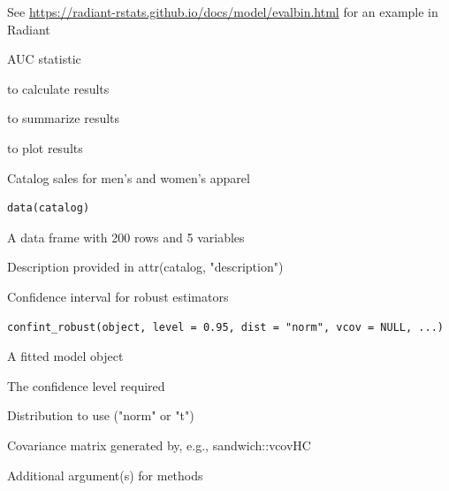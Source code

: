 \documentclass[a4paper]{book}
\begin{document}
%
\begin{Details}
See \url{https://radiant-rstats.github.io/docs/model/evalbin.html} for an example in Radiant
\end{Details}
%
\begin{Value}
AUC statistic
\end{Value}
%
\begin{SeeAlso}
 to calculate results

 to summarize results

 to plot results
\end{SeeAlso}
%
\begin{Examples}
\end{Examples}
%
\begin{Description}
Catalog sales for men's and women's apparel
\end{Description}
%
\begin{Usage}
\begin{verbatim}
data(catalog)
\end{verbatim}
\end{Usage}
%
\begin{Format}
A data frame with 200 rows and 5 variables
\end{Format}
%
\begin{Details}
Description provided in attr(catalog, "description")
\end{Details}
%
\begin{Description}
Confidence interval for robust estimators
\end{Description}
%
\begin{Usage}
\begin{verbatim}
confint_robust(object, level = 0.95, dist = "norm", vcov = NULL, ...)
\end{verbatim}
\end{Usage}
%
\begin{Arguments}
\begin{ldescription}
\item[\code{object}] A fitted model object

\item[\code{level}] The confidence level required

\item[\code{dist}] Distribution to use ("norm" or "t")

\item[\code{vcov}] Covariance matrix generated by, e.g., sandwich::vcovHC

\item[\code{...}] Additional argument(s) for methods
\end{ldescription}
\end{Arguments}
\end{document}

